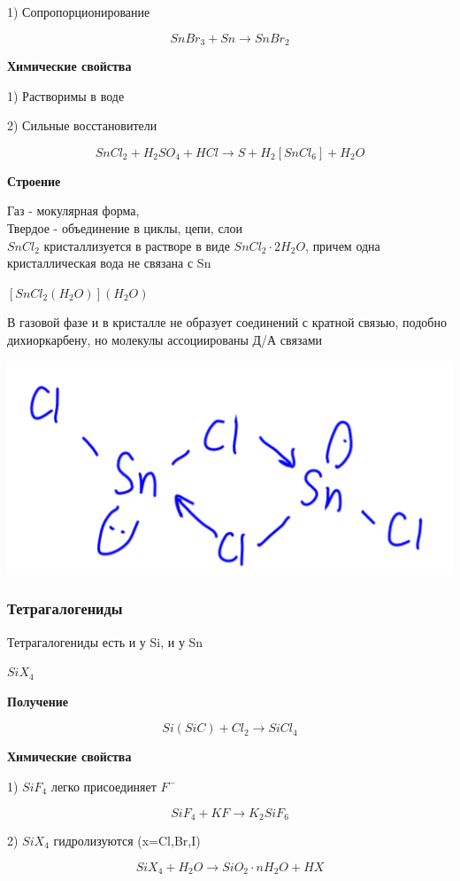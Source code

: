 1) Сопропорционирование

$$SnBr_3 + Sn \rightarrow SnBr_2$$

\textbf{Химические свойства}

1) Растворимы в воде

2) Сильные восстановители

$$SnCl_2 + H_2SO_4 + HCl \rightarrow S + H_2[SnCl_6] + H_2O$$

\textbf{Строение}

Газ - мокулярная форма,\\
Твердое - объединение в циклы, цепи, слои\\

$SnCl_2$ кристаллизуется в растворе в виде $SnCl_2\cdot 2H_2O$, причем одна кристаллическая вода не связана с Sn
 
$[SnCl_2(H_2O)](H_2O)$

В газовой фазе и в кристалле не образует соединений с кратной связью, подобно дихиоркарбену, но молекулы ассоциированы Д/А связами

\includegraphics{images/10v2.png}

\subsubsection*{Тетрагалогениды}

Тетрагалогениды есть и у Si, и у Sn

$SiX_4$

\textbf{Получение}

$$Si (SiC) + Cl_2 \rightarrow SiCl_4$$

\textbf{Химические свойства}

1) $SiF_4$ легко присоединяет $F^-$

$$SiF_4 + KF \rightarrow K_2SiF_6$$

2) $SiX_4$ гидролизуются (x=Cl,Br,I)

$$SiX_4 + H_2O \rightarrow SiO_2\cdot nH_2O + HX$$

